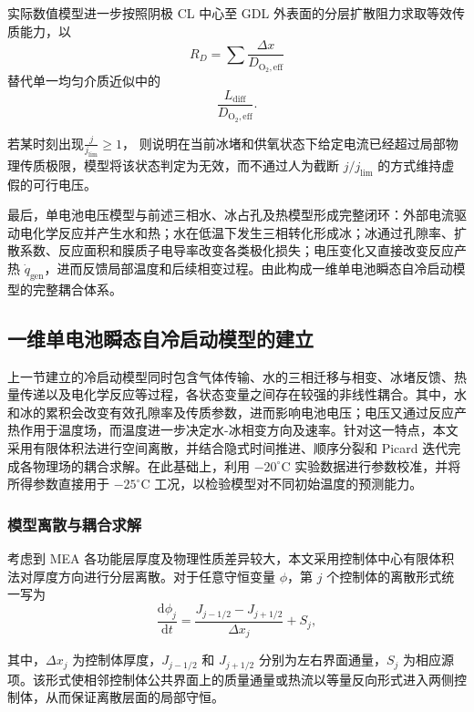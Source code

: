 \documentclass[bwprint]{gmcmthesis}
\numberwithin{figure}{section}
\begin{document}
\begin{itemize}
 实际数值模型进一步按照阴极 CL 中心至 GDL 外表面的分层扩散阻力求取等效传质能力，以
\[
R_D = \sum \frac{\Delta x}{D_{\text{O}_2,\text{eff}}}
\]
替代单一均匀介质近似中的
\[
\frac{L_{\text{diff}}}{D_{\text{O}_2,\text{eff}}}.
\]

 若某时刻出现$\frac{j}{j_{\text{lim}}} \geq 1$，
则说明在当前冰堵和供氧状态下给定电流已经超过局部物理传质极限，模型将该状态判定为无效，而不通过人为截断 \(j / j_{\text{lim}}\) 的方式维持虚假的可行电压。

 最后，单电池电压模型与前述三相水、冰占孔及热模型形成完整闭环：外部电流驱动电化学反应并产生水和热；水在低温下发生三相转化形成冰；冰通过孔隙率、扩散系数、反应面积和膜质子电导率改变各类极化损失；电压变化又直接改变反应产热 \(\dot{q}_{\text{gen}}\)，进而反馈局部温度和后续相变过程。由此构成一维单电池瞬态自冷启动模型的完整耦合体系。

\end{itemize}


\subsection{一维单电池瞬态自冷启动模型的建立}
上一节建立的冷启动模型同时包含气体传输、水的三相迁移与相变、冰堵反馈、热量传递以及电化学反应等过程，各状态变量之间存在较强的非线性耦合。其中，水和冰的累积会改变有效孔隙率及传质参数，进而影响电池电压；电压又通过反应产热作用于温度场，而温度进一步决定水-冰相变方向及速率。针对这一特点，本文采用有限体积法进行空间离散，并结合隐式时间推进、顺序分裂和 Picard 迭代完成各物理场的耦合求解。在此基础上，利用 \(-20^\circ\text{C}\) 实验数据进行参数校准，并将所得参数直接用于 \(-25^\circ\text{C}\) 工况，以检验模型对不同初始温度的预测能力。

\subsubsection{模型离散与耦合求解}

 考虑到 MEA 各功能层厚度及物理性质差异较大，本文采用控制体中心有限体积法对厚度方向进行分层离散。对于任意守恒变量 \(\phi\)，第 \(j\) 个控制体的离散形式统一写为
\begin{equation}
\frac{\mathrm{d}\phi_j}{\mathrm{d}t} = \frac{J_{j-1/2} - J_{j+1/2}}{\Delta x_j} + S_j, \tag{4-81}
\end{equation}

 其中，\(\Delta x_j\) 为控制体厚度，\(J_{j-1/2}\) 和 \(J_{j+1/2}\) 分别为左右界面通量，\(S_j\) 为相应源项。该形式使相邻控制体公共界面上的质量通量或热流以等量反向形式进入两侧控制体，从而保证离散层面的局部守恒。
\end{document}
